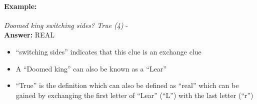 \paragraph{Example:} \emph{Doomed king switching sides? True (4)} - \citep{shuchiExchange09} \\
\textbf{Answer:} REAL 

\begin{itemize}
  \item ``switching sides'' indicates that this clue is an exchange clue 
  \item A ``Doomed king'' can also be known as a ``Lear''
  \item ``True'' is the definition which can also be defined as ``real'' which 
        can be gained by exchanging the first letter of ``Lear'' (``L'') with
        the last letter (``r'') 
\end{itemize}
